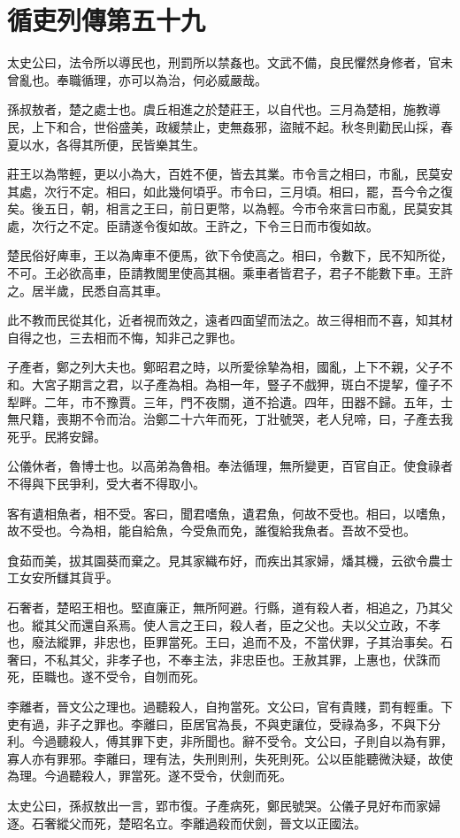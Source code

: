 \chapter{循吏列傳第五十九}

太史公曰，法令所以導民也，刑罰所以禁姦也。文武不備，良民懼然身修者，官未曾亂也。奉職循理，亦可以為治，何必威嚴哉。

孫叔敖者，楚之處士也。虞丘相進之於楚莊王，以自代也。三月為楚相，施教導民，上下和合，世俗盛美，政緩禁止，吏無姦邪，盜賊不起。秋冬則勸民山採，春夏以水，各得其所便，民皆樂其生。

莊王以為幣輕，更以小為大，百姓不便，皆去其業。市令言之相曰，市亂，民莫安其處，次行不定。相曰，如此幾何頃乎。市令曰，三月頃。相曰，罷，吾今令之復矣。後五日，朝，相言之王曰，前日更幣，以為輕。今市令來言曰市亂，民莫安其處，次行之不定。臣請遂令復如故。王許之，下令三日而市復如故。

楚民俗好庳車，王以為庳車不便馬，欲下令使高之。相曰，令數下，民不知所從，不可。王必欲高車，臣請教閭里使高其梱。乘車者皆君子，君子不能數下車。王許之。居半歲，民悉自高其車。

此不教而民從其化，近者視而效之，遠者四面望而法之。故三得相而不喜，知其材自得之也，三去相而不悔，知非己之罪也。

子產者，鄭之列大夫也。鄭昭君之時，以所愛徐摯為相，國亂，上下不親，父子不和。大宮子期言之君，以子產為相。為相一年，豎子不戲狎，斑白不提挈，僮子不犁畔。二年，市不豫賈。三年，門不夜關，道不拾遺。四年，田器不歸。五年，士無尺籍，喪期不令而治。治鄭二十六年而死，丁壯號哭，老人兒啼，曰，子產去我死乎。民將安歸。

公儀休者，魯博士也。以高弟為魯相。奉法循理，無所變更，百官自正。使食祿者不得與下民爭利，受大者不得取小。

客有遺相魚者，相不受。客曰，聞君嗜魚，遺君魚，何故不受也。相曰，以嗜魚，故不受也。今為相，能自給魚，今受魚而免，誰復給我魚者。吾故不受也。

食茹而美，拔其園葵而棄之。見其家織布好，而疾出其家婦，燔其機，云欲令農士工女安所讎其貨乎。

石奢者，楚昭王相也。堅直廉正，無所阿避。行縣，道有殺人者，相追之，乃其父也。縱其父而還自系焉。使人言之王曰，殺人者，臣之父也。夫以父立政，不孝也，廢法縱罪，非忠也，臣罪當死。王曰，追而不及，不當伏罪，子其治事矣。石奢曰，不私其父，非孝子也，不奉主法，非忠臣也。王赦其罪，上惠也，伏誅而死，臣職也。遂不受令，自刎而死。

李離者，晉文公之理也。過聽殺人，自拘當死。文公曰，官有貴賤，罰有輕重。下吏有過，非子之罪也。李離曰，臣居官為長，不與吏讓位，受祿為多，不與下分利。今過聽殺人，傅其罪下吏，非所聞也。辭不受令。文公曰，子則自以為有罪，寡人亦有罪邪。李離曰，理有法，失刑則刑，失死則死。公以臣能聽微決疑，故使為理。今過聽殺人，罪當死。遂不受令，伏劍而死。

太史公曰，孫叔敖出一言，郢市復。子產病死，鄭民號哭。公儀子見好布而家婦逐。石奢縱父而死，楚昭名立。李離過殺而伏劍，晉文以正國法。
